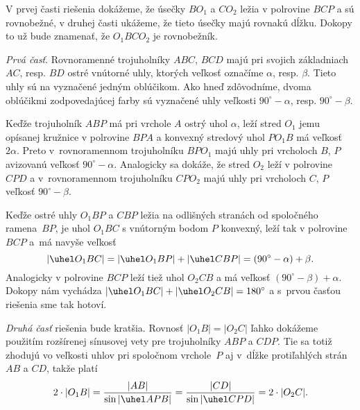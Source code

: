 {%
V prvej časti riešenia dokážeme, že úsečky $BO_1$ a $CO_2$ ležia v
polrovine $BCP$ a sú rovnobežné, v druhej časti ukážeme, že
tieto úsečky majú rovnakú dĺžku. Dokopy to už bude znamenať, že
$O_1BCO_2$ je rovnobežník.

\smallskip
\emph{Prvá časť}.
Rovnoramenné trojuholníky $ABC$, $BCD$ majú pri svojich základniach $AC$,
resp. $BD$ ostré vnútorné uhly, ktorých veľkosť označíme $\alpha$,
resp. $\beta$. Tieto uhly sú na \obr{} vyznačené jedným oblúčikom.
Ako hneď zdôvodníme, dvoma oblúčikmi zodpovedajúcej farby sú
vyznačené uhly veľkosti $90^{\circ}-\alpha$, resp. $90^{\circ}-\beta$.
%

Keďže trojuholník $ABP$ má pri vrchole $A$ ostrý uhol $\alpha$, leží stred
$O_1$ jemu opísanej kružnice v polrovine $BPA$ a konvexný stredový
uhol $PO_1B$ má veľkosť $2\alpha$. Preto v~rovnoramennom trojuholníku $BPO_1$
majú uhly pri vrcholoch $B$, $P$ avizovanú veľkosť $90^{\circ}-\alpha$.
Analogicky sa dokáže, že stred $O_2$ leží v polrovine $CPD$ a
v~rovnoramennom trojuholníku $CPO_2$ majú uhly pri vrcholoch $C$, $P$ veľkosť
$90^{\circ}-\beta$.

Keďže ostré uhly $O_1BP$ a $CBP$ ležia na odlišných stranách
od spoločného ramena~$BP$, je uhol $O_1BC$ s vnútorným bodom $P$
konvexný, leží tak v polrovine $BCP$ a~má navyše veľkosť
$$
|\uhel O_1BC|=|\uhel O_1BP|+|\uhel CBP|=(90^\circ-\alpha)+\beta.
$$
Analogicky v polrovine $BCP$ leží tiež uhol $O_2CB$ a
má veľkosť $(90^\circ-\beta)+\alpha$. Dokopy nám vychádza
$|\uhel O_1BC|+|\uhel O_2CB|=180^{\circ}$ a s~prvou časťou
riešenia sme tak hotoví.

\smallskip
\emph{Druhá časť} riešenia bude kratšia. Rovnosť $|O_1B|=|O_2C|$
ľahko dokážeme použitím rozšírenej sínusovej vety pre trojuholníky $ABP$ a
$CDP$. Tie sa totiž zhodujú vo veľkosti uhlov pri spoločnom
vrchole~$P$
aj v~dĺžke protiľahlých strán $AB$ a $CD$, takže platí
$$
2\cdot|O_1B| = \frac{|AB|}{\sin|\uhel APB|} =
\frac{|CD|}{\sin|\uhel CPD|} = 2\cdot|O_2C|.
$$}

